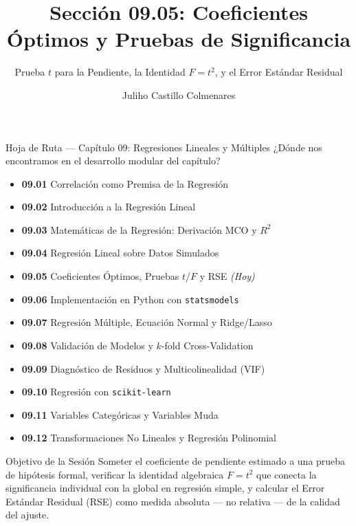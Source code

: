 \documentclass[10pt, aspectratio=169]{beamer}
\title[Coeficientes Óptimos]{Sección 09.05: Coeficientes Óptimos y Pruebas de Significancia}
\subtitle{Prueba $t$ para la Pendiente, la Identidad $F=t^2$, y el Error Estándar Residual}
\author[J. Castillo Colmenares]{Juliho Castillo Colmenares}
\institute{Tecnológico de Monterrey}
\date{\vspace{-1.2cm}}
\begin{document}
\begin{frame}[plain]
  \vspace{-0.8cm}
  \titlepage
\end{frame}

\begin{frame}{Hoja de Ruta --- Capítulo 09: Regresiones Lineales y Múltiples}
  \scriptsize
  ¿Dónde nos encontramos en el desarrollo modular del capítulo?
  \begin{itemize}\itemsep=0.02em
    \item \textbf{09.01} Correlación como Premisa de la Regresión
    \item \textbf{09.02} Introducción a la Regresión Lineal
    \item \textbf{09.03} Matemáticas de la Regresión: Derivación MCO y $R^2$
    \item \textbf{09.04} Regresión Lineal sobre Datos Simulados
    \item \textbf{09.05} Coeficientes Óptimos, Pruebas $t$/$F$ y RSE \emph{(Hoy)}
    \item \textbf{09.06} Implementación en Python con \texttt{statsmodels}
    \item \textbf{09.07} Regresión Múltiple, Ecuación Normal y Ridge/Lasso
    \item \textbf{09.08} Validación de Modelos y $k$-fold Cross-Validation
    \item \textbf{09.09} Diagnóstico de Residuos y Multicolinealidad (VIF)
    \item \textbf{09.10} Regresión con \texttt{scikit-learn}
    \item \textbf{09.11} Variables Categóricas y Variables Muda
    \item \textbf{09.12} Transformaciones No Lineales y Regresión Polinomial
  \end{itemize}
  \pause
  \vspace{-0.05cm}
  \begin{block}{Objetivo de la Sesión}
    Someter el coeficiente de pendiente estimado a una prueba de hipótesis formal, verificar la identidad algebraica $F=t^2$ que conecta la significancia individual con la global en regresión simple, y calcular el Error Estándar Residual (RSE) como medida absoluta --- no relativa --- de la calidad del ajuste.
  \end{block}
\end{frame}
\end{document}
